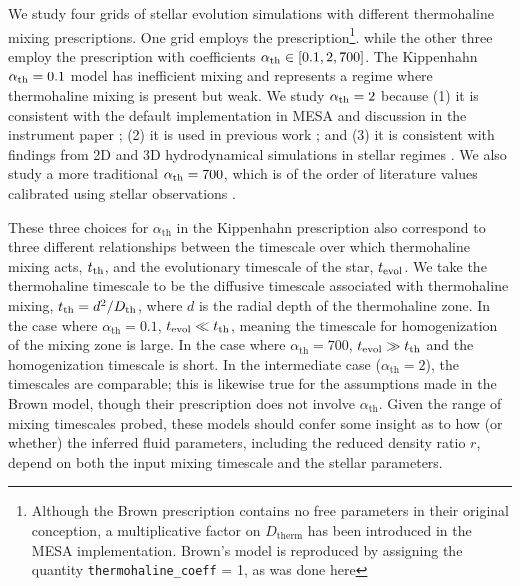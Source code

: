 We study four grids of stellar evolution simulations with different thermohaline mixing prescriptions. One grid employs the \citet{brown_etal_2013} prescription\footnote{Although the Brown prescription contains no free parameters in their original conception, a multiplicative factor on $D_{\text{therm}}$ has been introduced in the MESA implementation. Brown's model is reproduced by assigning the quantity \texttt{thermohaline\_coeff} = 1, as was done here}. 
%
while the other three employ the \citet{kippenhahn_etal_1980} prescription with coefficients $\alpha_{\rm th} \in [0.1, 2, 700]$. %
The Kippenhahn $\alpha_{\rm th} = 0.1$ model has inefficient mixing and represents a regime where thermohaline mixing is present but weak.
%
%
We study $\alpha_{\rm th} = 2$ because (1) it is consistent with the default implementation in MESA and discussion in the instrument paper \citep{mesa2}; (2) it is used in previous work \citep{CantielloLanger2010, TayarJoyce22}; and (3) it is consistent with findings from 2D and 3D hydrodynamical simulations in stellar regimes 
\citep{Denissenkov2010, Traxler2011, brown_etal_2013}. We also study a more traditional $\alpha_{\rm th} = 700$, which is of the order of literature values calibrated 
using stellar observations \citep{lattanzio_etal_2015, charbonnel_thermohaline_2007}.

These three choices for $\alpha_{\text{th}}$ in the Kippenhahn prescription also correspond to three different relationships between the timescale over which thermohaline mixing acts, $t_{\rm th}$, and the evolutionary timescale of the star, $t_{\rm{evol}}$. 
We take the thermohaline timescale to be the diffusive timescale associated with thermohaline mixing, $t_{\rm th} = d^2/D_{\rm th}$, where $d$ is the radial depth of the thermohaline zone.
In the case where $\alpha_{\text{th}} = 0.1$, 
$t_{\rm evol} \ll t_{\rm th}$, meaning the timescale for homogenization of the mixing zone is large. In the case where $\alpha_{\text{th}} = 700$, 
$t_{\rm evol} \gg t_{\rm th}$ and the homogenization timescale is short. In the intermediate case ($\alpha_{\text{th}}= 2$), the timescales are comparable; this is likewise true for the assumptions made in the Brown model, though their prescription does not involve $\alpha_{\text{th}}$. 
%
Given the range of mixing timescales probed, these models should confer some insight as to how (or whether) the inferred fluid parameters, including the reduced density ratio $r$, depend on both the input mixing timescale and the stellar parameters.

